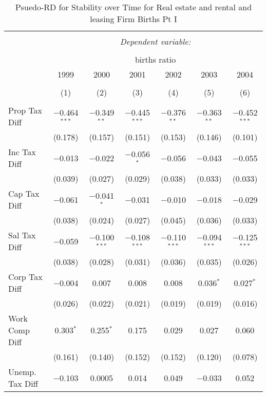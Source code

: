 
\begin{table}[!htbp] \centering 
  \caption{Psuedo-RD for Stability over Time for  Real estate and rental and leasing Firm Births Pt I} 
  \label{53year} 
\small 
\begin{tabular}{@{\extracolsep{5pt}}lcccccc} 
\\[-1.8ex]\hline 
\hline \\[-1.8ex] 
 & \multicolumn{6}{c}{\textit{Dependent variable:}} \\ 
\cline{2-7} 
\\[-1.8ex] & \multicolumn{6}{c}{births ratio} \\ 
 & 1999 & 2000 & 2001 & 2002 & 2003 & 2004 \\ 
\\[-1.8ex] & (1) & (2) & (3) & (4) & (5) & (6)\\ 
\hline \\[-1.8ex] 
 Prop Tax Diff & $-$0.464$^{***}$ & $-$0.349$^{**}$ & $-$0.445$^{***}$ & $-$0.376$^{**}$ & $-$0.363$^{**}$ & $-$0.452$^{***}$ \\ 
  & (0.178) & (0.157) & (0.151) & (0.153) & (0.146) & (0.101) \\ 
  Inc Tax Diff & $-$0.013 & $-$0.022 & $-$0.056$^{*}$ & $-$0.056 & $-$0.043 & $-$0.055 \\ 
  & (0.039) & (0.027) & (0.029) & (0.038) & (0.033) & (0.033) \\ 
  Cap Tax Diff & $-$0.061 & $-$0.041$^{*}$ & $-$0.031 & $-$0.010 & $-$0.018 & $-$0.029 \\ 
  & (0.038) & (0.024) & (0.027) & (0.045) & (0.036) & (0.033) \\ 
  Sal Tax Diff & $-$0.059 & $-$0.100$^{***}$ & $-$0.108$^{***}$ & $-$0.110$^{***}$ & $-$0.094$^{***}$ & $-$0.125$^{***}$ \\ 
  & (0.038) & (0.028) & (0.031) & (0.036) & (0.035) & (0.026) \\ 
  Corp Tax Diff & $-$0.004 & 0.007 & 0.008 & 0.008 & 0.036$^{*}$ & 0.027$^{*}$ \\ 
  & (0.026) & (0.022) & (0.021) & (0.019) & (0.019) & (0.016) \\ 
  Work Comp Diff & 0.303$^{*}$ & 0.255$^{*}$ & 0.175 & 0.029 & 0.027 & 0.060 \\ 
  & (0.161) & (0.140) & (0.152) & (0.152) & (0.120) & (0.078) \\ 
  Unemp. Tax Diff & $-$0.103 & 0.0005 & 0.014 & 0.049 & $-$0.033 & 0.052 \\ 

\end{tabular}
\end{table}
